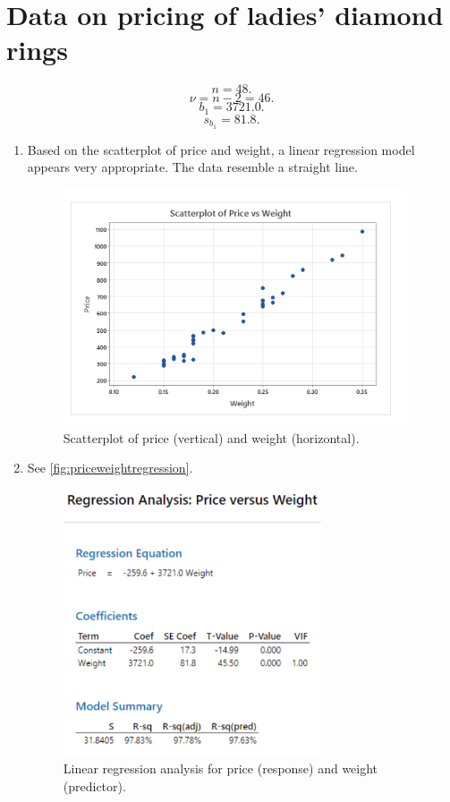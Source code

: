 \documentclass[12pt]{article}
\begin{document}
\section{Data on pricing of ladies' diamond rings}
\[n=48.\]
\[\nu=n-2=46.\]
\[b_1=3721.0.\]
\[s_{b_1}=81.8.\]
\begin{enumerate}
\item Based on the scatterplot of price and weight, a linear regression model appears very appropriate. The data resemble a straight line.
\begin{figure}[h]
\begin{center}
\includegraphics[width=4in]{images/price-weight-scatterplot.png}
\end{center}
\caption{Scatterplot of price (vertical) and weight (horizontal).}
\end{figure}
\item See \autoref{fig:priceweightregression}.
\begin{figure}
\begin{center}
\includegraphics[width=3in]{images/price-weight-regression.png}
\end{center}
\caption{Linear regression analysis for price (response) and weight (predictor).\label{fig:priceweightregression}}

\end{figure}
\end{enumerate}
\end{document}
